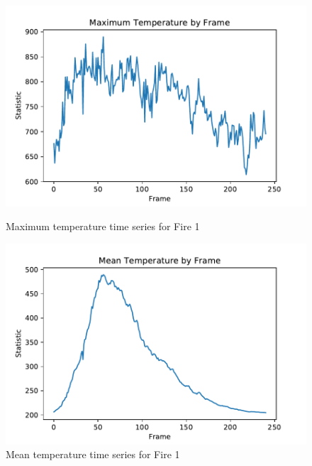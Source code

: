 \documentclass{article}
\begin{document}
\begin{figure}[ht] 
\centering
  \label{ fig7} 
  \begin{minipage}[b]{0.5\linewidth}
    \centering
    \includegraphics[width=1.1\linewidth]{../plots/f1_maxtemp.pdf} 
    \caption{Maximum temperature time series for Fire 1} 
    \vspace{4ex}
  \end{minipage}%
  \begin{minipage}[b]{0.5\linewidth}
    \centering
    \includegraphics[width=1.1\linewidth]{../plots/f1_meantemp.pdf} 
    \caption{Mean temperature time series for Fire 1} 
    \vspace{4ex}
  \end{minipage} 
  \begin{minipage}[b]{0.5\linewidth}
    \centering

\end{minipage}
\end{figure}
\end{document}
